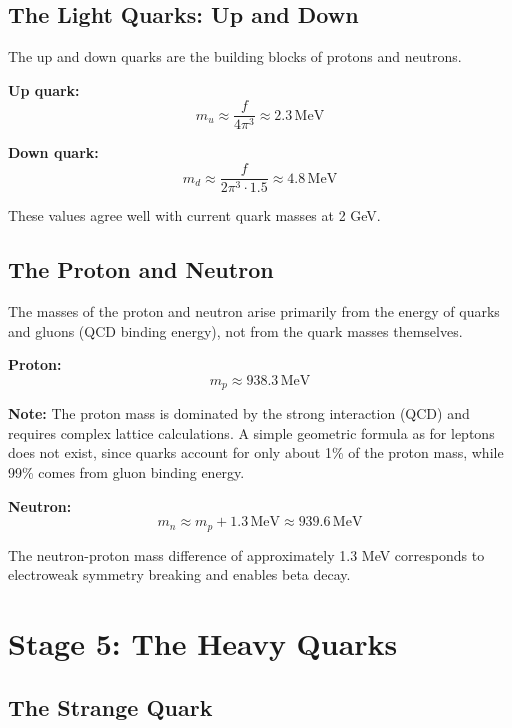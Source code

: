 	\subsection{The Light Quarks: Up and Down}
	
	The up and down quarks are the building blocks of protons and neutrons.
	
	\textbf{Up quark:}
	\begin{equation}
		m_u \approx \frac{f}{4\pi^3} \approx 2.3\,\text{MeV}
	\end{equation}
	
	\textbf{Down quark:}
	\begin{equation}
		m_d \approx \frac{f}{2\pi^3 \cdot 1.5} \approx 4.8\,\text{MeV}
	\end{equation}
	
	These values agree well with current quark masses at 2 GeV.
	
	\subsection{The Proton and Neutron}
	
	The masses of the proton and neutron arise primarily from the energy of quarks and gluons (QCD binding energy), not from the quark masses themselves.
	
	\textbf{Proton:}
	\begin{equation}
		m_p \approx 938.3\,\text{MeV}
	\end{equation}
	
	\textbf{Note:} The proton mass is dominated by the strong interaction (QCD) and requires complex lattice calculations. A simple geometric formula as for leptons does not exist, since quarks account for only about 1\% of the proton mass, while 99\% comes from gluon binding energy.
	
	\textbf{Neutron:}
	\begin{equation}
		m_n \approx m_p + 1.3\,\text{MeV} \approx 939.6\,\text{MeV}
	\end{equation}
	
	The neutron-proton mass difference of approximately 1.3 MeV corresponds to electroweak symmetry breaking and enables beta decay.
	
	\section{Stage 5: The Heavy Quarks}
	
	\subsection{The Strange Quark}
	
